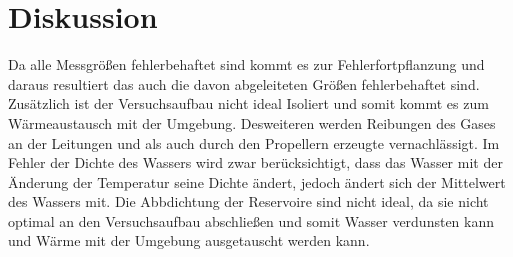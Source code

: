 \section{Diskussion}
\label{sec:Diskussion}
Da alle Messgrößen fehlerbehaftet sind kommt es zur Fehlerfortpflanzung und daraus resultiert das auch die davon abgeleiteten Größen fehlerbehaftet sind. Zusätzlich ist der Versuchsaufbau nicht ideal Isoliert und somit kommt es zum Wärmeaustausch mit der Umgebung. Desweiteren werden Reibungen des Gases an der Leitungen und als auch durch den Propellern erzeugte vernachlässigt. Im Fehler der Dichte des Wassers wird zwar berücksichtigt, dass das Wasser mit der Änderung der Temperatur seine Dichte ändert, jedoch ändert sich der Mittelwert des Wassers mit. Die Abbdichtung der Reservoire sind nicht ideal, da sie nicht optimal an den Versuchsaufbau abschließen und somit Wasser verdunsten kann und Wärme mit der Umgebung ausgetauscht werden kann.
